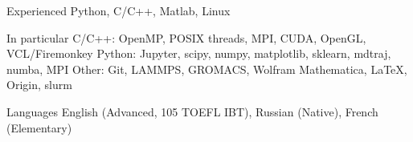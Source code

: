 

\begin{cvskills}

  \cvskill
    {Experienced} %
    {Python, \hspace{7pt} C/C++, \hspace{7pt} Matlab, \hspace{7pt} Linux} %

  \cvskill
    {In particular} %
    {\textsf{C/C++:} OpenMP, \hspace{4pt} POSIX threads, \hspace{4pt} MPI, \hspace{4pt} CUDA, \hspace{4pt} OpenGL, \hspace{4pt} VCL/Firemonkey \newline 
    \textsf{Python:} Jupyter, \hspace{4pt} scipy, \hspace{4pt} numpy, \hspace{4pt} matplotlib, \hspace{4pt} sklearn, \hspace{4pt} mdtraj, \hspace{4pt} numba, \hspace{4pt} MPI \newline
\textsf{Other:} Git, \hspace{4pt} LAMMPS, \hspace{4pt} GROMACS, \hspace{4pt} Wolfram Mathematica, \hspace{4pt} \LaTeX, \hspace{4pt} Origin, \hspace{4pt} slurm} %

  \cvskill
    {Languages} %
    {English (Advanced, 105 TOEFL IBT), \hspace{7pt} Russian (Native), \hspace{7pt} French (Elementary)} %

\end{cvskills}
